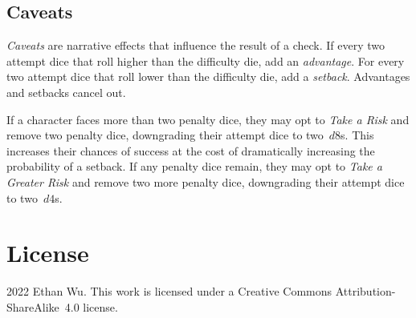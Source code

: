 \documentclass[twocolumn]{article}
\begin{document}
\subsection{Caveats}
\emph{Caveats} are narrative effects that influence the result of a check. If
every two attempt dice that roll higher than the difficulty die, add an
\emph{advantage}. For every two attempt dice that roll lower than the difficulty
die, add a \emph{setback}. Advantages and setbacks cancel out.

If a character faces more than two penalty dice, they may opt to \emph{Take a
Risk} and remove two penalty dice, downgrading their attempt dice to two~$d8$s.
This increases their chances of success at the cost of dramatically increasing
the probability of a setback. If any penalty dice remain, they may opt to
\emph{Take a Greater Risk} and remove two more penalty dice, downgrading their
attempt dice to two~$d4$s.

\section{License}
\textcopyright{} 2022 Ethan Wu. This work is licensed under a Creative Commons
Attribution-ShareAlike~4.0 license. \ccbysa
\end{document}
